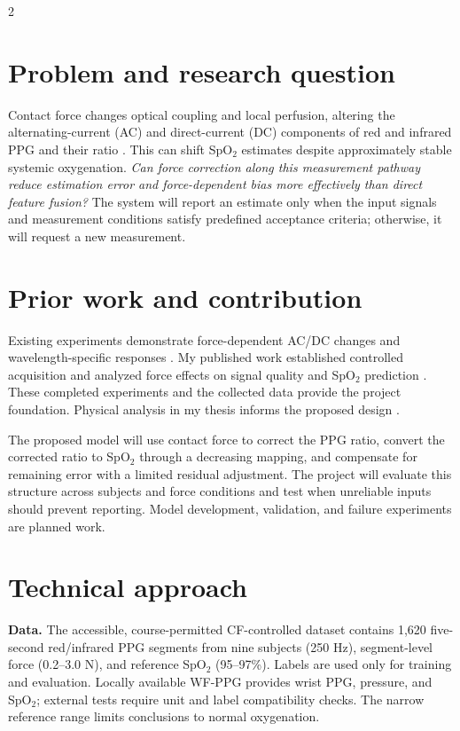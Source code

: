 \documentclass[10pt]{article}
\begin{document}
\begin{multicols*}{2}
\section{Problem and research question}
Contact force changes optical coupling and local perfusion, altering the alternating-current (AC) and direct-current (DC) components of red and infrared PPG and their ratio \cite{teng,sirkia}. This can shift SpO$_2$ estimates despite approximately stable systemic oxygenation. \textit{Can force correction along this measurement pathway reduce estimation error and force-dependent bias more effectively than direct feature fusion?} The system will report an estimate only when the input signals and measurement conditions satisfy predefined acceptance criteria; otherwise, it will request a new measurement.

\section{Prior work and contribution}
Existing experiments demonstrate force-dependent AC/DC changes and wavelength-specific responses \cite{teng,sirkia}. My published work established controlled acquisition and analyzed force effects on signal quality and SpO$_2$ prediction \cite{he}. These completed experiments and the collected data provide the project foundation. Physical analysis in my thesis informs the proposed design \cite{thesis}.

The proposed model will use contact force to correct the PPG ratio, convert the corrected ratio to SpO$_2$ through a decreasing mapping, and compensate for remaining error with a limited residual adjustment. The project will evaluate this structure across subjects and force conditions and test when unreliable inputs should prevent reporting. Model development, validation, and failure experiments are planned work.

\section{Technical approach}
\textbf{Data.} The accessible, course-permitted CF-controlled dataset contains 1,620 five-second red/infrared PPG segments from nine subjects (250 Hz), segment-level force (0.2--3.0 N), and reference SpO$_2$ (95--97\%). Labels are used only for training and evaluation. Locally available WF-PPG \cite{ho} provides wrist PPG, pressure, and SpO$_2$; external tests require unit and label compatibility checks. The narrow reference range limits conclusions to normal oxygenation.


\end{multicols*}
\end{document}
